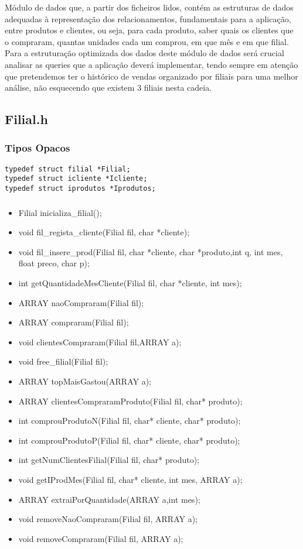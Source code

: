 Módulo de dados que, a partir dos ficheiros lidos, contém as estruturas de dados adequadas à representação dos relacionamentos, fundamentais para a aplicação, entre produtos e clientes, ou seja, para cada produto, saber quais os clientes que o compraram, quantas unidades cada um comprou, em que mês e em que filial. Para a estruturação optimizada dos dados deste módulo de dados será crucial analisar as queries que a aplicação deverá implementar, tendo sempre em atenção que pretendemos ter o histórico de vendas organizado por filiais para uma melhor análise, não esquecendo que existem 3 filiais nesta cadeia. 

\subsection{Filial.h}

\subsubsection{Tipos Opacos}
\begin{Verbatim}
typedef struct filial *Filial;
typedef struct icliente *Icliente;
typedef struct iprodutos *Iprodutos;
\end{Verbatim}

\subsubsection{}

\begin{itemize}
\item	Filial inicializa\_filial();
\item	void fil\_regista\_cliente(Filial fil, char *cliente);
\item	void fil\_insere\_prod(Filial fil, char *cliente, char *produto,int q, int mes, float preco, char p);
\item	int getQuantidadeMesCliente(Filial fil, char *cliente, int mes);
\item	ARRAY naoCompraram(Filial fil);
\item	ARRAY compraram(Filial fil);
\item	void clientesCompraram(Filial fil,ARRAY a);
\item	void free\_filial(Filial fil);
\item	ARRAY topMaisGastou(ARRAY a);
\item	ARRAY clientesCompraramProduto(Filial fil, char* produto);
\item	int comprouProdutoN(Filial fil, char* cliente, char* produto);
\item	int comprouProdutoP(Filial fil, char* cliente, char* produto);
\item	int getNumClientesFilial(Filial fil, char* produto);
\item	void getIProdMes(Filial fil, char* cliente, int mes, ARRAY a);
\item	ARRAY extraiPorQuantidade(ARRAY a,int mes);
\item	void removeNaoCompraram(Filial fil, ARRAY a);
\item	void removeCompraram(Filial fil, ARRAY a);
\end{itemize}


